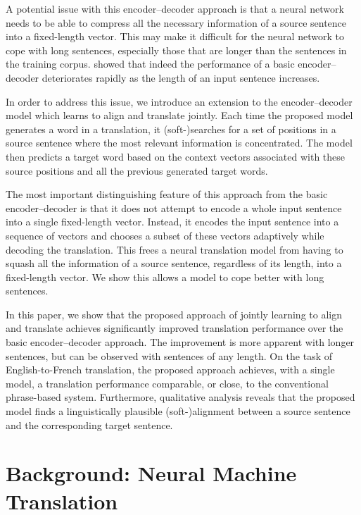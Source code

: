 \documentclass{article} %
\begin{document}
A potential issue with this encoder--decoder approach is that a neural network
needs to be able to compress all the necessary information of a source sentence
into a fixed-length vector.  This may make it difficult for the neural network
to cope with long sentences, especially those that are longer than the
sentences in the training corpus.  \citet{Cho2014a} showed that indeed the
performance of a basic encoder--decoder deteriorates rapidly as the length of
an input sentence increases. 

In order to address this issue, we introduce an extension to the
encoder--decoder model which learns to align and translate jointly. Each time
the proposed model generates a word in a translation, it \mbox{(soft-)searches}
for a set of positions in a source sentence where the most relevant information
is concentrated.  The model then predicts a target word based on the context
vectors associated with these source positions and all the previous generated
target words. 

The most important distinguishing feature of this approach from the basic
encoder--decoder is that it does not attempt to encode a whole input sentence
into a single fixed-length vector. Instead, it encodes the input sentence into
a sequence of vectors and chooses a subset of these vectors adaptively while
decoding the translation. This frees a neural translation model from having to
squash all the information of a source sentence, regardless of its length, into
a fixed-length vector. We show this allows a model to cope better with long
sentences.

In this paper, we show that the proposed approach of jointly learning to align
and translate achieves significantly improved translation performance over the
basic encoder--decoder approach. The improvement is more apparent with longer
sentences, but can be observed with sentences of any length. On the task of
English-to-French translation, the proposed approach achieves, with a single
model, a translation performance comparable, or close, to the conventional
phrase-based system.  Furthermore, qualitative analysis reveals that the
proposed model finds a linguistically plausible \mbox{(soft-)alignment} between
a source sentence and the corresponding target sentence.


\section{Background: Neural Machine Translation}
\end{document}
